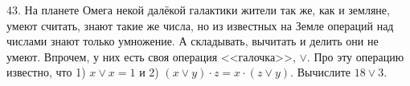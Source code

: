 43. На планете Омега некой далёкой галактики жители так же, как и земляне, умеют считать, знают такие же числа, но из известных на Земле операций над числами знают только умножение. А складывать, вычитать и делить они не умеют. Впрочем, у них есть своя операция <<галочка>>, $\vee.$ Про эту операцию известно, что 1) $x\vee x=1$ и 2)
$(x\vee y)\cdot z=x\cdot(z\vee y).$ Вычислите $18\vee 3.$\\
